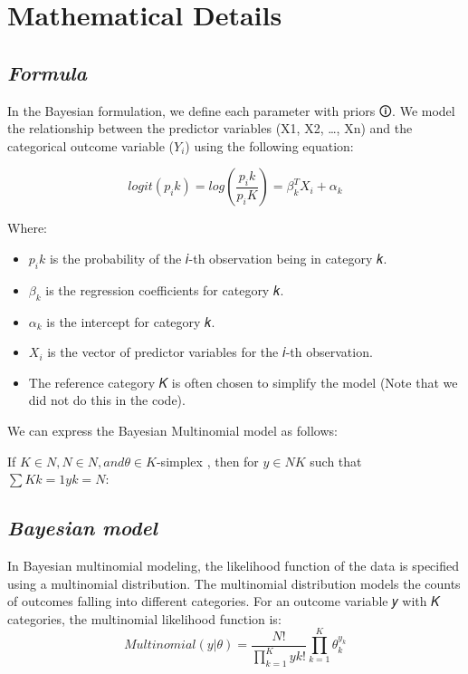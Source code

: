 \documentclass[
  letterpaper,
  DIV=11,
  numbers=noendperiod]{scrreprt}
\begin{document}
\section{Mathematical Details}\label{mathematical-details-8}

\subsection{\texorpdfstring{\emph{Formula}}{Formula}}\label{formula-2}

In the Bayesian formulation, we define each parameter with
\label{prior}{{priors 🛈}}. We model the relationship
between the predictor variables (X1, X2, \ldots, Xn) and the categorical
outcome variable (\(Y_i\)) using the following equation:

\[
logit(p_ik) = log(\frac{p_ik}{p_iK})  = β_k^T X_i + α_k
\]

Where:

\begin{itemize}
\item
  \(p_ik\) is the probability of the 𝑖-th observation being in category
  𝑘.
\item
  \(β_k\) is the regression coefficients for category 𝑘.
\item
  \(α_k\) is the intercept for category 𝑘.
\item
  \(X_i\) is the vector of predictor variables for the 𝑖-th observation.
\item
  The reference category 𝐾 is often chosen to simplify the model (Note
  that we did not do this in the code).
\end{itemize}

We can express the Bayesian Multinomial model as follows:

If \(K∈N ,  N∈N , and  θ∈K\)-simplex , then for \(y∈NK\) such that
\(∑Kk=1yk=N\):

\subsection{\texorpdfstring{\emph{Bayesian
model}}{Bayesian model}}\label{bayesian-model-2}

In Bayesian multinomial modeling, the likelihood function of the data is
specified using a multinomial distribution. The multinomial distribution
models the counts of outcomes falling into different categories. For an
outcome variable 𝑦 with 𝐾 categories, the multinomial likelihood
function is: \[
Multinomial(y|θ)=\frac{N!}{∏^K_{k=1}yk!} ∏_{k=1}^{K} θ_{k}^{y_k}
\]
\end{document}
